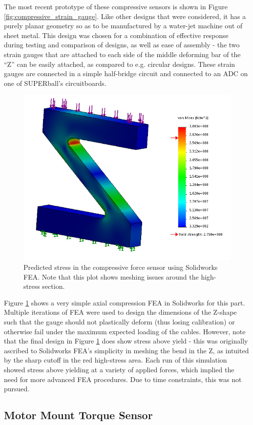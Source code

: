 \documentclass[12pt]{report}
\begin{document}
The most recent prototype of these compressive sensors is shown in Figure \ref{fig:compressive_strain_gauge}.
Like other designs that were considered, it has a purely planar geometry so as to be manufactured by a water-jet machine out of sheet metal.
This design was chosen for a combination of effective response during testing and comparison of designs, as well as ease of assembly - the two strain gauges that are attached to each side of the middle deforming bar of the ``Z'' can be easily attached, as compared to e.g. circular designs.
These strain gauges are connected in a simple half-bridge circuit and connected to an ADC on one of SUPERball's circuitboards.

\begin{figure}[thpb]
      \centering
      \includegraphics[width=.5\columnwidth]{img/Symmetric_Z_FEA.jpg}
      \caption{Predicted stress in the compressive force sensor using Solidworks FEA. Note that this plot shows meshing issues around the high-stress section.}
      \label{fig:compressive_strain_gauge_fea}
      \vspace{-0.2cm}
\end{figure}

Figure \ref{fig:compressive_strain_gauge_fea} shows a very simple axial compression FEA in Solidworks for this part.
Multiple iterations of FEA were used to design the dimensions of the Z-shape such that the gauge should not plastically deform (thus losing calibration) or otherwise fail under the maximum expected loading of the cables.
However, note that the final design in Figure \ref{fig:compressive_strain_gauge_fea} does show stress above yield - this was originally ascribed to Solidworks FEA's simplicity in meshing the bend in the Z, as intuited by the sharp cutoff in the red high-stress area.
Each run of this simulation showed stress above yielding at a variety of applied forces, which implied the need for more advanced FEA procedures.
Due to time constraints, this was not pursued.

\subsection{Motor Mount Torque Sensor}
\end{document}
